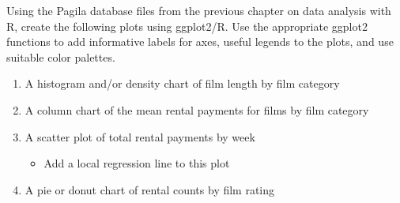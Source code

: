 \begin{withcode}
\begin{exerciseboxcomputer}
Using the Pagila database files from the previous chapter on data analysis with R, create the following plots using ggplot2/R. Use the appropriate ggplot2 functions to add informative labels for axes, useful legends to the plots, and use suitable color palettes. 

\begin{enumerate}
   \item A histogram and/or density chart of film length by film category
   \item A column chart of the mean rental payments for films by film category
   \item A scatter plot of total rental payments by week
   \begin{itemize}
      \item Add a local regression line to this plot
   \end{itemize}
   \item A pie or donut chart of rental counts by film rating
\end{enumerate}
\end{exerciseboxcomputer}

\end{withcode}
\FloatBarrier

